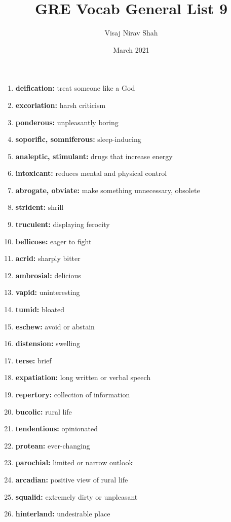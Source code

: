 \documentclass{article}
\title{\textbf{GRE Vocab General List 9}}
\author{Visaj Nirav Shah}
\date{March 2021}
\begin{document}
\maketitle

\begin{enumerate}
    \item \textbf{deification: }{treat someone like a God}
    \item \textbf{excoriation: }{harsh criticism}
    \item \textbf{ponderous: }{unpleasantly boring}
    \item \textbf{soporific, somniferous: }{sleep-inducing}
    \item \textbf{analeptic, stimulant: }{drugs that increase energy}
    \item \textbf{intoxicant: }{reduces mental and physical control}
    \item \textbf{abrogate, obviate: }{make something unnecessary, obsolete}
    \item \textbf{strident: }{shrill}
    \item \textbf{truculent: }{displaying ferocity}
    \item \textbf{bellicose: }{eager to fight}
    \item \textbf{acrid: }{sharply bitter}
    \item \textbf{ambrosial: }{delicious}
    \item \textbf{vapid: }{uninteresting}
    \item \textbf{tumid: }{bloated}
    \item \textbf{eschew: }{avoid or abstain}
    \item \textbf{distension: }{swelling}
    \item \textbf{terse: }{brief}
    \item \textbf{expatiation: }{long written or verbal speech}
    \item \textbf{repertory: }{collection of information}
    \item \textbf{bucolic: }{rural life}
    \item \textbf{tendentious: }{opinionated}
    \item \textbf{protean: }{ever-changing}
    \item \textbf{parochial: }{limited or narrow outlook}
    \item \textbf{arcadian: }{positive view of rural life}
    \item \textbf{squalid: }{extremely dirty or unpleasant}
    \item \textbf{hinterland: }{undesirable place}

\end{enumerate}
\end{document}
